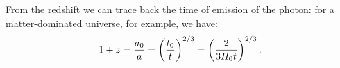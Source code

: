 \documentclass[main.tex]{subfiles}
\begin{document}

From the redshift we can trace back the time of emission of the photon: for a matter-dominated universe, for example, we have:
%
\begin{align}
1 + z  = \frac{a_0 }{a} =  \qty(\frac{t_0 }{t})^{2/3}
= \qty(\frac{2}{3H_0 t })^{2/3} 
\,.
\end{align}
%
\end{document}
